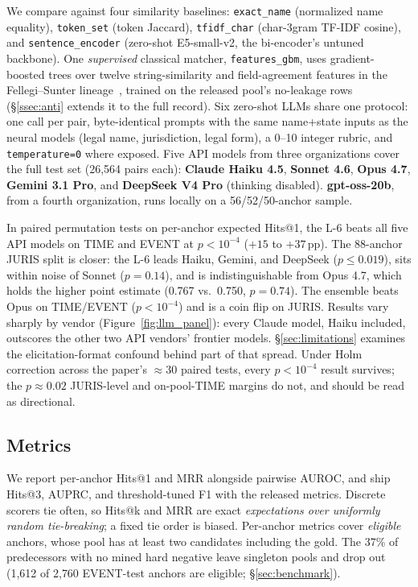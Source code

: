 \documentclass[sigconf]{acmart}
\begin{document}
We compare against four similarity baselines:
\texttt{exact\_name} (normalized name equality), \texttt{token\_set}
(token Jaccard), \texttt{tfidf\_char} (char-3gram TF-IDF cosine),
and \texttt{sentence\_encoder} (zero-shot E5-small-v2, the
bi-encoder's untuned backbone). One \emph{supervised} classical
matcher, \texttt{features\_gbm}, uses gradient-boosted trees over
twelve string-similarity and field-agreement features in the
Fellegi--Sunter lineage~\cite{fellegisunter1969}, trained on the
released pool's no-leakage rows (\S\ref{ssec:anti} extends it to
the full record). Six zero-shot LLMs share one protocol: one call
per pair, byte-identical prompts with the same name+state inputs as
the neural models (legal name, jurisdiction, legal form), a 0--10
integer rubric, and \texttt{temperature=0} where exposed. Five API
models from three organizations cover the full test set (26{,}564
pairs each): \textbf{Claude Haiku 4.5}, \textbf{Sonnet 4.6},
\textbf{Opus 4.7}, \textbf{Gemini 3.1 Pro}, and \textbf{DeepSeek V4
Pro} (thinking disabled). \textbf{gpt-oss-20b}, from a fourth
organization, runs locally on a 56/52/50-anchor sample.

In paired permutation tests on per-anchor expected Hits@1, the L-6
beats all five API models on TIME and EVENT at $p<10^{-4}$ ($+15$
to $+37$\,pp). The 88-anchor JURIS
split is closer: the L-6 leads Haiku, Gemini, and DeepSeek
($p\leq 0.019$), sits within noise of Sonnet ($p=0.14$), and is
indistinguishable from Opus 4.7, which holds the higher point
estimate (0.767 vs.\ 0.750, $p=0.74$). The ensemble beats Opus on
TIME/EVENT ($p<10^{-4}$) and is a coin flip on JURIS. Results vary
sharply by vendor (Figure~\ref{fig:llm_panel}): every Claude model,
Haiku included, outscores the other two API vendors' frontier
models. \S\ref{sec:limitations} examines the elicitation-format
confound behind part of that spread. Under Holm
correction across the paper's $\approx$30 paired tests, every
$p<10^{-4}$ result survives; the $p\approx0.02$ JURIS-level and
on-pool-TIME margins do not, and should be read as directional.

\subsection{Metrics}
\label{ssec:metrics}

We report per-anchor Hits@1 and MRR alongside pairwise AUROC, and
ship Hits@3, AUPRC, and threshold-tuned F1 with the released
metrics. Discrete scorers tie often, so Hits@k and MRR are exact
\emph{expectations over uniformly random tie-breaking}; a fixed tie
order is biased. Per-anchor metrics cover \emph{eligible}
anchors, whose pool has at least two candidates including the
gold. The 37\% of
predecessors with no mined hard negative leave singleton pools and
drop out (1{,}612 of 2{,}760 EVENT-test anchors are eligible;
\S\ref{sec:benchmark}).
\end{document}
